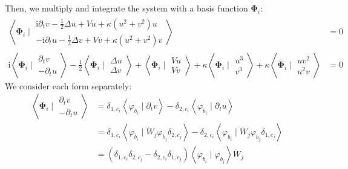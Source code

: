 \documentclass{article}
\newcommand{\bvec}[1]{\boldsymbol{#1}}
\newcommand{\ii}{\mathrm{i}}
\begin{document}
Then, we multiply and integrate the system with a basis function $\bvec{\Phi}_i$:
\begin{align*}
    \left< \bvec{\Phi}_i \mid \begin{matrix}
            \ii \partial_t v - \frac{1}{2} \Delta u + V u + \kappa (u^2 + v^2) u \\
            -\ii \partial_t u - \frac{1}{2} \Delta v + V v + \kappa (u^2 + v^2) v
        \end{matrix} \right> & = 0 \\
    \ii \left< \bvec{\Phi}_i \mid \begin{matrix}
            \partial_t v \\
            -\partial_t u
        \end{matrix} \right> - \frac{1}{2} \left< \bvec{\Phi}_i \mid \begin{matrix}
            \Delta u \\
            \Delta v
        \end{matrix} \right> + \left< \bvec{\Phi}_i \mid \begin{matrix}
            V u \\
            V v
        \end{matrix} \right> + \kappa \left< \bvec{\Phi}_i \mid \begin{matrix}
            u^3 \\
            v^3
        \end{matrix} \right> + \kappa \left< \bvec{\Phi}_i \mid \begin{matrix}
            u v^2 \\
            u^2 v
        \end{matrix} \right> & = 0
\end{align*}
\noindent We consider each form separately:
\begin{align*}
    \left< \bvec{\Phi}_i \mid \begin{matrix}
        \partial_t v \\
        -\partial_t u
    \end{matrix} \right>
    & = \delta_{1, c_i} \left< \varphi_{b_i} \mid \partial_t v \right>
        - \delta_{2, c_i} \left< \varphi_{b_i} \mid \partial_t u \right> \\
    & = \delta_{1, c_i} \left< \varphi_{b_i} \mid \dot{W}_j \varphi_{b_j} \delta_{2, c_j} \right>
        - \delta_{2, c_i} \left< \varphi_{b_i} \mid \dot{W}_j \varphi_{b_j} \delta_{1, c_j} \right> \\
    & = (\delta_{1, c_i} \delta_{2, c_j} - \delta_{2, c_i} \delta_{1, c_j})
        \left< \varphi_{b_i} \mid \varphi_{b_j} \right> \dot{W}_j
\end{align*}
\end{document}
